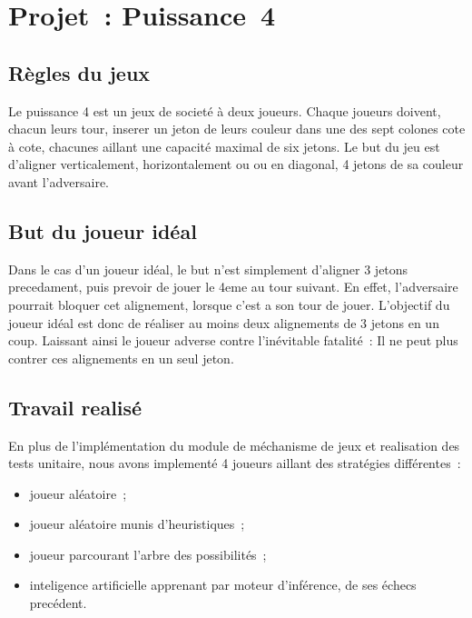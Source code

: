 \chapter{Projet~: Puissance~4}

\section{Règles du jeux}

Le puissance 4 est un jeux de societé à deux joueurs. Chaque joueurs doivent,
chacun leurs tour, inserer un jeton de leurs couleur dans une des sept
colones cote à cote, chacunes aillant une capacité maximal de
six jetons. Le but du jeu est d'aligner verticalement, horizontalement ou
ou en diagonal, 4 jetons de sa couleur avant l'adversaire.


\section{But du joueur idéal}

Dans le cas d'un joueur idéal, le but n'est simplement d'aligner 3 jetons precedament,
puis prevoir de jouer le 4eme au tour suivant. En effet, l'adversaire pourrait bloquer cet alignement,
lorsque c'est a son tour de jouer. L'objectif du joueur idéal est donc de réaliser
au moins deux alignements de 3 jetons en un coup. Laissant ainsi le joueur adverse
contre l'inévitable fatalité~: Il ne peut plus contrer ces alignements en un seul jeton.


\section{Travail realisé}

En plus de l'implémentation du module de méchanisme de jeux et realisation des
tests unitaire, nous avons implementé 4 joueurs aillant des stratégies différentes~:

\begin{itemize}

    \item joueur aléatoire~;
    \item joueur aléatoire munis d'heuristiques~;
    \item joueur parcourant l'arbre des possibilités~;
    \item inteligence artificielle apprenant par moteur d'inférence, de ses
    échecs precédent.

\end{itemize}

